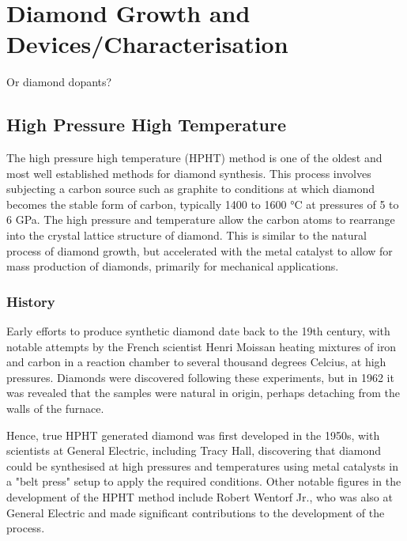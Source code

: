 \chapter{Diamond Growth and Devices/Characterisation}%
Or diamond dopants?

\label{ch:diamond}
\section{High Pressure High Temperature}
The high pressure high temperature (HPHT) method is one of the oldest and most well established methods for diamond synthesis. This process involves subjecting a carbon source such as graphite to conditions at which diamond becomes the stable form of carbon, typically 1400 to 1600 \si{\degreeCelsius} at pressures of 5 to 6 \si{\giga\pascal}. The high pressure and temperature allow the carbon atoms to rearrange into the crystal lattice structure of diamond. This is similar to the natural process of diamond growth, but accelerated with the metal catalyst to allow for mass production of diamonds, primarily for mechanical applications. 
\subsection{History}
Early efforts to produce synthetic diamond date back to the 19th century, with notable attempts by the French scientist Henri Moissan heating mixtures of iron and carbon in a reaction chamber to several thousand degrees Celcius, at high pressures. Diamonds were discovered following these experiments, but in 1962 it was revealed that the samples were natural in origin, perhaps detaching from the walls of the furnace.

Hence, true HPHT generated diamond was first developed in the 1950s, with scientists at General Electric, including Tracy Hall, discovering that diamond could be synthesised at high pressures and temperatures using metal catalysts in a "belt press" setup to apply the required conditions. Other notable figures in the development of the HPHT method include Robert Wentorf Jr., who was also at General Electric and made significant contributions to the development of the process.

